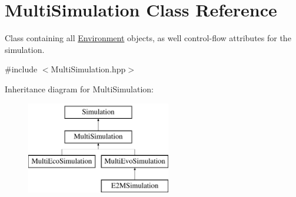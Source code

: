\hypertarget{classMultiSimulation}{}\section{Multi\+Simulation Class Reference}
\label{classMultiSimulation}


Class containing all \hyperlink{classEnvironment}{Environment} objects, as well control-\/flow attributes for the simulation.  




{\ttfamily \#include $<$Multi\+Simulation.\+hpp$>$}

Inheritance diagram for Multi\+Simulation\+:\begin{figure}[H]
\begin{center}
\leavevmode
\includegraphics[height=4.000000cm]{classMultiSimulation}
\end{center}
\end{figure}
